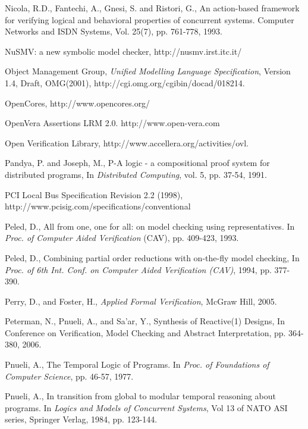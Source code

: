 {\begin{thebibliography}{99}
 Nicola, R.D., Fantechi, A., Gnesi, S. and Ristori, G., An
    action-based framework for verifying logical and behavioral properties
    of concurrent systems. Computer Networks and ISDN Systems,
    Vol. 25(7), pp. 761-778, 1993. 

 NuSMV: a new symbolic model checker, http://nusmv.irst.itc.it/

 Object Management Group, {\em Unified Modelling
	Language Specification}, Version 1.4, Draft, OMG(2001),
	http://cgi.omg.org/cgibin/docad/018214. 

 OpenCores, http://www.opencores.org/

 OpenVera Assertions LRM 2.0. http://www.open-vera.com

 Open Verification Library, 
	http://www.accellera.org/activities/ovl.

 Pandya, P. and Joseph, M., P-A logic - a compositional
        proof system for distributed programs,
        In {\em Distributed Computing}, vol. 5, pp. 37-54, 1991. 

 PCI Local Bus Specification Revision 2.2 (1998), \\
        http://www.pcisig.com/specifications/conventional

 Peled, D., All from one, one for all: on model checking
	using representatives. In {\em Proc. of Computer Aided Verification}
	(CAV), pp. 409-423, 1993.

 Peled, D., Combining partial order reductions with 
	on-the-fly model checking, In {\em Proc. of 6th Int. Conf. on 
	Computer Aided Verification (CAV)}, 1994, pp. 377-390.

 Perry, D., and Foster, H., {\em Applied Formal 
	Verification}, McGraw Hill, 2005.

 Peterman, N., Pnueli, A., and Sa'ar, Y.,
    Synthesis of Reactive(1) Designs, In Conference on
    Verification, Model Checking and Abstract Interpretation,
    pp. 364-380, 2006. 

 Pnueli, A., The Temporal Logic of Programs. In
        {\em Proc. of Foundations of Computer Science}, pp. 46-57, 1977.

 Pnueli, A., In transition from global to modular temporal
	reasoning about programs. In {\em Logics and Models of Concurrent
	Systems}, Vol 13 of NATO ASI series, Springer Verlag, 1984, pp. 123-144.


\end{thebibliography}}
